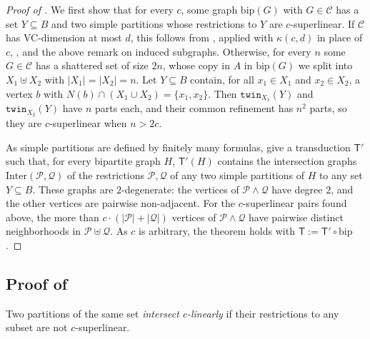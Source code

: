 \documentclass[11pt]{article}
\theoremstyle{definition}
\newcommand{\CC}{{\mathscr C}}
\newcommand{\set}[1]{\{#1\}}
\newcommand{\Pp}{\mathcal{P}}
\newcommand{\Qq}{\mathcal{Q}}
\newcommand{\remph}[1]{{\color{red} \emph{#1}}}
\newcommand{\twin}{\mathtt{twin}}
\begin{document}
\begin{proof}[Proof of ]
We first show that for every $c$, some graph $\text{bip}(G)$ with $G \in \CC$ has a set $Y \subseteq B$ and two simple partitions whose restrictions to $Y$ are $c$-superlinear.
If $\CC$ has VC-dimension at most $d$, this follows from , applied with $\kappa(c, d)$ in place of $c$, , and the above remark on induced subgraphs.
Otherwise, for every $n$ some $G \in \CC$ has a shattered set of size $2n$, whose copy in $A$ in $\text{bip}(G)$ we split into $X_1 \uplus X_2$ with $|X_1| = |X_2| = n$.
Let $Y \subseteq B$ contain, for all $x_1 \in X_1$ and $x_2 \in X_2$, a vertex $b$ with $N(b) \cap (X_1 \cup X_2) = \set{x_1, x_2}$.
Then $\twin_{X_1}(Y)$ and $\twin_{X_2}(Y)$ have $n$ parts each, and their common refinement has $n^2$ parts, so they are $c$-superlinear when $n > 2c$.

As simple partitions are defined by finitely many formulas,  give a transduction $\mathsf T'$ such that, for every bipartite graph $H$, $\mathsf T'(H)$ contains the intersection graphs $\text{Inter}(\Pp, \Qq)$ of the restrictions $\Pp, \Qq$ of any two simple partitions of $H$ to any set $Y \subseteq B$.
These graphs are $2$-degenerate: the vertices of $\Pp \wedge \Qq$ have degree $2$, and the other vertices are pairwise non-adjacent.
For the $c$-superlinear pairs found above, the more than $c \cdot (|\Pp| + |\Qq|)$ vertices of $\Pp \wedge \Qq$ have pairwise distinct neighborhoods in $\Pp \uplus \Qq$.
As $c$ is arbitrary, the theorem holds with $\mathsf T := \mathsf T' \circ \text{bip}$.
\end{proof}

\subsection{Proof of }
\label{sec:proof-simple}

Two partitions of the same set \remph{intersect $c$-linearly} if their restrictions to any subset are not $c$-superlinear.
\end{document}
